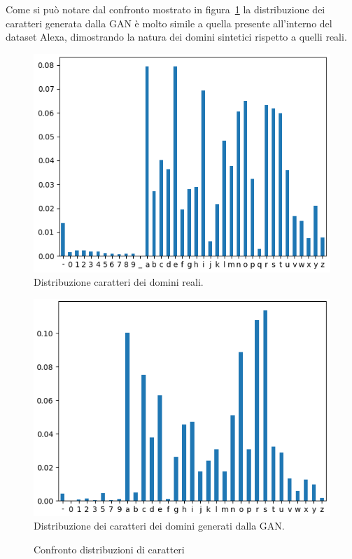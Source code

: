 Come si può notare dal confronto mostrato in figura~\ref{fig:chardistr} la distribuzione dei caratteri generata dalla GAN è molto simile a quella presente all'interno del dataset Alexa, dimostrando la natura dei domini sintetici rispetto a quelli reali.

\begin{figure}[!bp]
    \centering
    \begin{minipage}[t]{\columnwidth}
    \centering
		\includegraphics[width=0.85\linewidth]{figures/all_legit_char_distr.png} \\
		Distribuzione caratteri dei domini reali.
	\end{minipage}\hfill
	\vspace{1cm}
	\begin{minipage}[b]{\columnwidth}
	\centering
		\includegraphics[width=0.85\linewidth]{figures/chars_histogram.png} \\
		Distribuzione dei caratteri dei domini generati dalla GAN.
	\end{minipage}
\caption{Confronto distribuzioni di caratteri \label{fig:chardistr}}
\end{figure}

